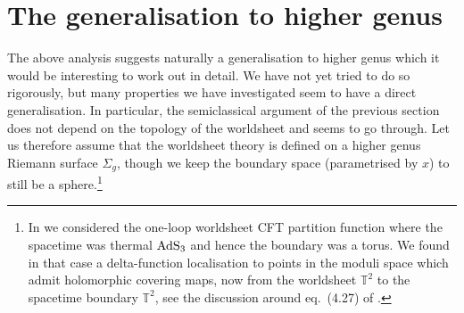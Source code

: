 \documentclass[12pt,a4paper]{article}
\begin{document}
\section{The generalisation to higher genus}\label{sec:genus}

The above analysis suggests naturally a generalisation to higher genus which it would be interesting to work out in detail. We have not yet tried to do so rigorously, but many properties we have investigated seem to have a direct generalisation. In particular, the semiclassical argument of the previous section does not depend on the topology of the worldsheet and seems to go through. Let us therefore assume that the worldsheet theory is defined on a higher genus Riemann surface $\Sigma_g$, though we keep the boundary space (parametrised by $x$) to still be a sphere.\footnote{In \cite{Eberhardt:2018ouy} we considered the one-loop worldsheet CFT partition function where the spacetime was thermal ${\rm AdS}_3$ and hence the boundary was a torus. We found in that case a delta-function localisation to points in the moduli space which admit holomorphic covering maps, now from the worldsheet $\mathbb{T}^2$ to the spacetime boundary $\mathbb{T}^2$, see the discussion around eq.~(4.27) of \cite{Eberhardt:2018ouy}.}
\end{document}
